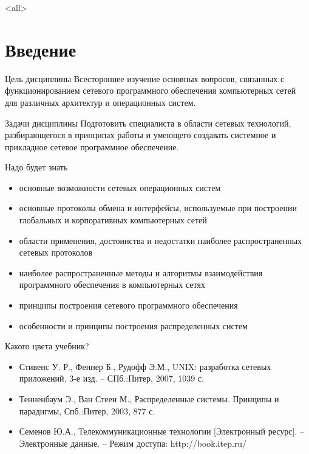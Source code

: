 
\subtitle{Введение}



\mode<all>{}

%
%
\section{Введение}

\begin{frame}{Цель дисциплины}
	Всестороннее изучение основных вопросов, связанных с функционированием сетевого программного обеспечения компьютерных сетей для различных архитектур и операционных систем.
\end{frame}

\begin{frame}{Задачи дисциплины}
	Подготовить специалиста в области сетевых технологий,  разбирающегося в принципах работы и умеющего создавать системное и прикладное сетевое программное обеспечение.
\end{frame}

\begin{frame}{Надо будет знать}
	\begin{itemize}
		\item основные возможности сетевых операционных систем
		\item основные протоколы обмена и интерфейсы, используемые при построении глобальных и корпоративных компьютерных сетей
		\item области применения,  достоинства и недостатки наиболее распространенных сетевых протоколов
		\item наиболее распространенные методы и алгоритмы взаимодействия программного обеспечения в компьютерных сетях
		\item принципы построения сетевого программного обеспечения
		\item особенности и принципы построения распределенных систем
	\end{itemize}
\end{frame}

\begin{frame}{Какого цвета учебник?}
	\begin{itemize}
		\item Стивенс У. Р.,  Феннер Б.,  Рудофф Э.М.,  UNIX: разработка сетевых приложений. 3-е изд. – СПб.:Питер,  2007,  1039 с.
		\item Тенненбаум Э.,  Ван Стеен М.,  Распределенные системы. Принципы и парадигмы,  Спб.:Питер,  2003,  877 с.
		\item Семенов Ю.А.,  Телекоммуникационные технологии [Электронный ресурс]. – Электронные данные. – Режим доступа: http://book.itep.ru/
	\end{itemize}
\end{frame}

